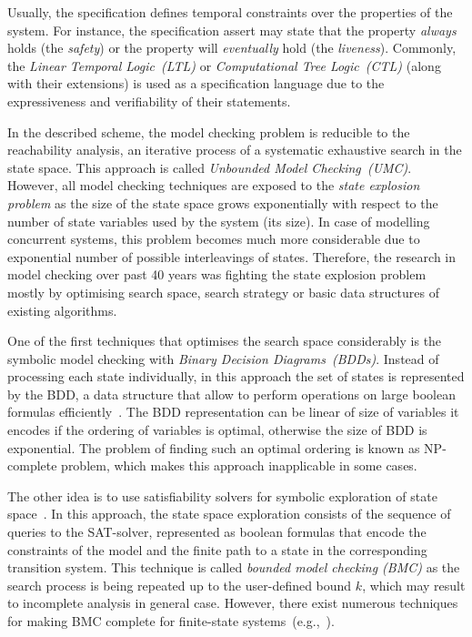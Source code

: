 Usually, the specification defines temporal constraints over the properties of the system.
For instance, the specification assert may state that the property \textit{always} holds (the \textit{safety}) or the property will \textit{eventually} hold (the \textit{liveness}).
Commonly, the \textit{Linear Temporal Logic~(LTL)} or \textit{Computational Tree Logic~(CTL)} (along with their extensions) is used as a specification language due to the expressiveness and verifiability of their statements.

In the described scheme, the model checking problem is reducible to the reachability analysis, an iterative process of a systematic exhaustive search in the state space.
This approach is called \textit{Unbounded Model Checking~(UMC)}.
However, all model checking techniques are exposed to the \textit{state explosion problem} as the size of the state space grows exponentially with respect to the number of state variables used by the system (its size).
In case of modelling concurrent systems, this problem becomes much more considerable due to exponential number of possible interleavings of states.
Therefore, the research in model checking over past 40 years was fighting the state explosion problem mostly by optimising search space, search strategy or basic data structures of existing algorithms.

One of the first techniques that optimises the search space considerably is the symbolic model checking with \textit{Binary Decision Diagrams~(BDDs)}.
Instead of processing each state individually, in this approach the set of states is represented by the BDD, a data structure that allow to perform operations on large boolean formulas efficiently~\cite{clarke2012model}.
The BDD representation can be linear of size of variables it encodes if the ordering of variables is optimal, otherwise the size of BDD is exponential.
The problem of finding such an optimal ordering is known as NP-complete problem, which makes this approach inapplicable in some cases.

The other idea is to use satisfiability solvers for symbolic exploration of state space~\cite{clarke2001bounded}.
In this approach, the state space exploration consists of the sequence of queries to the SAT-solver, represented as boolean formulas that encode the constraints of the model and the finite path to a state in the corresponding transition system.  
This technique is called \textit{bounded model checking (BMC)} as the search process is being repeated up to the user-defined bound $k$, which may result to incomplete analysis in general case.
However, there exist numerous techniques for making BMC complete for finite-state systems~(e.g.,~\cite{shtrichman2000tuning}).

